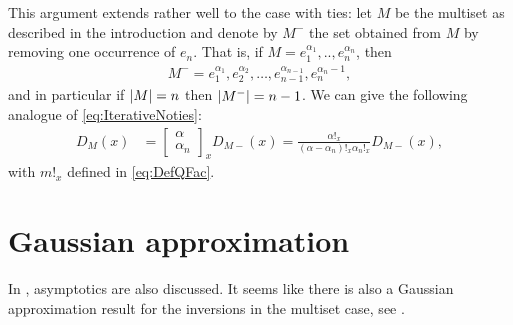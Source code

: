 \documentclass{article}
\DeclarePairedDelimiter\abs{\lvert}{\rvert}
\begin{document}
This argument extends rather well to the case with ties: let $M$ be the multiset as described in the introduction and denote by $M^-$ the set obtained from $M$ by removing one occurrence of $e_n$. That is, if $M=e_1^{\alpha_1},..,e_n^{\alpha_n}$, then
\begin{align}
    M^- = e_1^{\alpha_1}, e_2^{\alpha_2},\ldots,e_{n-1}^{\alpha_{n-1}}, e_n^{\alpha_n-1},
\end{align}
and in particular if $\abs{M}=n$ then $\abs{M^-}=n-1$. We can give the following analogue of \eqref{eq:IterativeNoties}:
\begin{align}
    D_M(x) & = \begin{bmatrix}\alpha\\ \alpha_n\end{bmatrix}_x D_{M-}(x) = \frac{\alpha!_x}{(\alpha-\alpha_n)!_x \alpha_n!_x} D_{M-}(x),
\end{align}
with $m!_x$ defined in \eqref{eq:DefQFac}.



\section{Gaussian approximation}

In \cite{Margolius2001}, asymptotics are also discussed. It seems like there is also a Gaussian approximation result for the inversions in the multiset case, see \cite{Conger2007}. 





\end{document}
